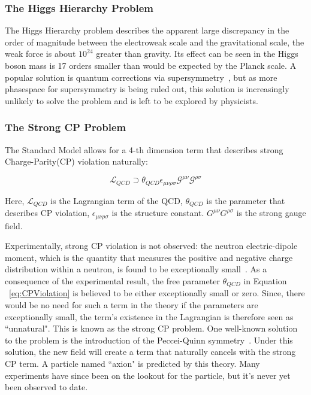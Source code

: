 {\subsubsection{The Higgs Hierarchy Problem}
The Higgs Hierarchy problem describes the apparent large discrepancy in the order of magnitude between the electroweak scale and the gravitational scale, the weak force is about $10^{24}$ greater than gravity. Its effect can be seen in the Higgs boson mass is 17 orders smaller than would be expected by the Planck scale.
A popular solution is quantum corrections via supersymmetry~\cite{2018SUSY}, but as more phasespace for supersymmetry is being ruled out, this solution is increasingly unlikely to solve the problem and is left to be explored by physicists.

\subsubsection{The Strong CP Problem}
\label{sec:strongcp}
The Standard Model allows for a 4-th dimension term that describes strong Charge-Parity(CP) violation naturally:

\begin{equation}
    \mathcal{L}_{QCD} \supset \theta_{QCD}\epsilon_{\mu\nu\rho\sigma} \mathcal{G}^{\mu\nu}\mathcal{G}^{\rho\sigma}
    \label{eq:CPViolation}
\end{equation}

Here, $\mathcal{L}_{QCD}$ is the Lagrangian term of the QCD, $\theta_{QCD}
$ is the parameter that describes CP violation,  $\epsilon_{\mu\nu\rho\sigma}$ is the structure constant. $G^{\mu\nu}G^{\rho\sigma}$ is the strong gauge field.

Experimentally, strong CP violation is not observed: the neutron electric-dipole moment, which is the quantity that measures the positive and negative charge distribution within a neutron, is found to be exceptionally small~\cite{PhysRevLett.124.081803}. As a consequence of the experimental result, the free parameter $\theta_{QCD}$ in Equation ~\ref{eq:CPViolation} is believed to be either exceptionally small or zero. Since, there would be no need for such a term in the theory if the
parameters are exceptionally small, the term's existence in the Lagrangian is therefore seen as ``unnatural". This is known as the strong CP problem.
One well-known solution to the problem is the introduction of the Peccei-Quinn symmetry~\cite{PQSym}. Under this solution, the new field will create a term that naturally cancels with the strong CP term. A particle named ``axion" is predicted by this theory. Many experiments have since been on the lookout for the particle, but it's never yet been observed to date.

}
